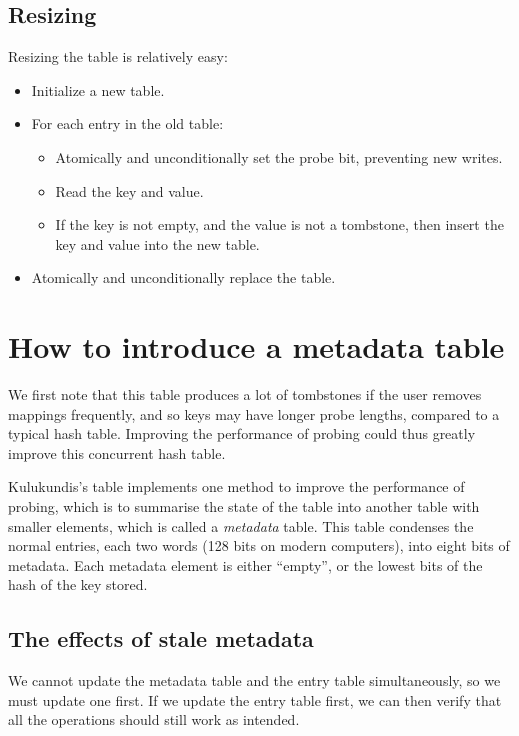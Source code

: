 \documentclass{article}
\begin{document}
\subsection{Resizing}

Resizing the table is relatively easy:
\begin{itemize}
\item Initialize a new table.
\item For each entry in the old table:
  \begin{itemize}
  \item Atomically and unconditionally set the probe bit, preventing
    new writes.
  \item Read the key and value.
  \item If the key is not empty, and the value is not a tombstone,
    then insert the key and value into the new table.
  \end{itemize}
\item Atomically and unconditionally replace the table.
\end{itemize}

\section{How to introduce a metadata table}

We first note that this table produces a lot of tombstones if the user
removes mappings frequently, and so keys may have longer probe lengths,
compared to a typical hash table. Improving the performance of probing
could thus greatly improve this concurrent hash table.

Kulukundis's table implements one method to improve the performance of
probing, which is to summarise the state of the table into another table
with smaller elements, which is called a \emph{metadata} table. This
table condenses the normal entries, each two words (128 bits on modern
computers), into eight bits of metadata. Each metadata element is either
``empty'', or the lowest bits of the hash of the key stored.

\subsection{The effects of stale metadata}

We cannot update the metadata table and the entry table simultaneously,
so we must update one first. If we update the entry table first, we can
then verify that all the operations should still work as intended.
\end{document}
